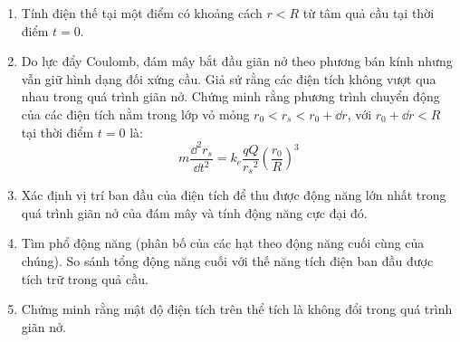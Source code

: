 \begin{vd}
\begin{enumerate}[1)]
   \item Tính điện thế tại một điểm có khoảng cách $r<R$ từ tâm quả cầu tại thời điểm $t=0$.
    \item Do lực đẩy Coulomb, đám mây bắt đầu giãn nở theo phương bán kính nhưng vẫn giữ hình dạng đối xứng cầu. Giả sử rằng các điện tích không vượt qua nhau trong quá trình giãn nở. Chứng minh rằng phương trình chuyển động của các điện tích nằm trong lớp vỏ mỏng $r_0<r_s < r_0 + \dd r$, với $r_0 + \dd r <R$ tại thời điểm $t=0$ là:
      $$m\frac{\dd^2 r_s}{\dd t^2} = k_e \frac{qQ}{{r_s}^2}\left(\frac{r_0}{R}\right)^3 $$
\item Xác định vị trí ban đầu của điện tích để thu được động năng lớn nhất trong quá trình giãn nở của đám mây và tính động năng cực đại đó.
 \item Tìm phổ động năng (phân bố của các hạt theo động năng cuối cùng của chúng). So sánh tổng động năng cuối với thế năng tích điện ban đầu được tích trữ trong quả cầu.
\item Chứng minh rằng mật độ điện tích trên thể tích là không đổi trong quá trình giãn nở.

\end{enumerate}
\end{vd}

